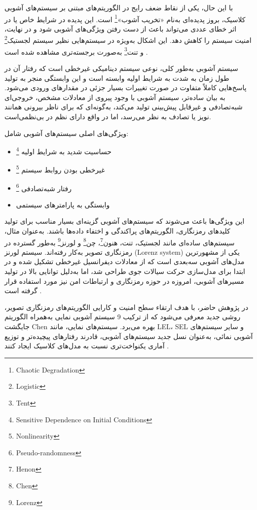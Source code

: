 \documentclass[a4paper,12pt]{report}
\renewcommand{\%}{\lr{\oldpercent}}
\providecommand{\lr}[1]{#1}
\providecommand{\LTRfootnote}[1]{\footnote{#1}}
\begin{document}
با این حال، یکی از نقاط ضعف رایج در الگوریتم‌های مبتنی بر سیستم‌های آشوبی کلاسیک، بروز پدیده‌ای به‌نام «تخریب آشوب»\LTRfootnote{Chaotic Degradation} است. این پدیده در شرایط خاص یا در اثر خطای عددی می‌تواند باعث از دست رفتن ویژگی‌های آشوبی شود و در نهایت، امنیت سیستم را کاهش دهد. این اشکال به‌ویژه در سیستم‌هایی نظیر سیستم لجستیک\LTRfootnote{Logistic} و تنت\LTRfootnote{Tent} به‌صورت برجسته‌تری مشاهده شده است \cite{ref5}.

سیستم آشوبی به‌طور کلی، نوعی سیستم دینامیکی غیرخطی است که رفتار آن در طول زمان به شدت به شرایط اولیه وابسته است و این وابستگی منجر به تولید پاسخ‌هایی کاملاً متفاوت در صورت تغییرات بسیار جزئی در مقدارهای ورودی می‌شود. به بیان ساده‌تر، سیستم آشوبی با وجود پیروی از معادلات مشخص، خروجی‌ای شبه‌تصادفی و غیرقابل پیش‌بینی تولید می‌کند، به‌گونه‌ای که برای ناظر بیرونی همانند نویز یا تصادف به نظر می‌رسد، اما در واقع دارای نظم در بی‌نظمی‌است.

ویژگی‌های اصلی سیستم‌های آشوبی شامل:
\begin{itemize}
    \item حساسیت شدید به شرایط اولیه \LTRfootnote{Sensitive Dependence on Initial Conditions}
    \item غیرخطی بودن روابط سیستم \LTRfootnote{Nonlinearity}
    \item رفتار شبه‌تصادفی \LTRfootnote{Pseudo-randomness}
    \item وابستگی به پارامترهای سیستمی
\end{itemize}

این ویژگی‌ها باعث می‌شوند که سیستم‌های آشوبی گزینه‌ای بسیار مناسب برای تولید کلیدهای رمزنگاری، الگوریتم‌های پراکندگی و اختفاء داده‌ها باشند. به‌عنوان مثال، سیستم‌های ساده‌ای مانند لجستیک، تنت، هنون\LTRfootnote{Henon}، چن\LTRfootnote{Chen} و لورنز\LTRfootnote{Lorenz} به‌طور گسترده در رمزنگاری تصویر به‌کار رفته‌اند. سیستم لورنز (\lr{Lorenz system}) یکی از مشهورترین مدل‌های آشوبی سه‌بعدی است که از معادلات دیفرانسیل غیرخطی تشکیل شده و در ابتدا برای مدل‌سازی حرکت سیالات جوی طراحی شد، اما به‌دلیل توانایی بالا در تولید مسیرهای آشوبی، امروزه در حوزه رمزنگاری و ارتباطات امن نیز مورد استفاده قرار گرفته است \cite{ref6}.

در پژوهش حاضر، با هدف ارتقاء سطح امنیت و کارایی الگوریتم‌های رمزنگاری تصویر، روشی جدید معرفی می‌شود که از ترکیب 9 سیستم آشوبی نمایی به‌همراه الگوریتم جایگشت \lr{Chen} بهره می‌برد. سیستم‌های نمایی، مانند \lr{LEL}، \lr{SEL} و سایر سیستم‌های آشوبی نمائی، به‌عنوان نسل جدید سیستم‌های آشوبی، قادرند رفتارهای پیچیده‌تر و توزیع آماری یکنواخت‌تری نسبت به مدل‌های کلاسیک ایجاد کنند \cite{ref4}.
\end{document}
